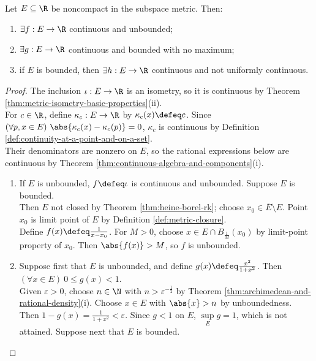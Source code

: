 \begin{theorem} \label{thm:compactness-hypotheses-are-essential} \\
Let $E\subseteq\R$ be noncompact in the subspace metric. Then:
\begin{enumerate}[label=(\roman*)]
\setlength{\itemsep}{0pt}
\item $\exists f:E\to\R$ continuous and unbounded;
\item $\exists g:E\to\R$ continuous and bounded with no maximum;
\item if $E$ is bounded, then $\exists h:E\to\R$ continuous and not uniformly continuous.
\end{enumerate}
\begin{proof}
The inclusion $\iota:E\to\R$ is an isometry, so it is continuous by Theorem \ref{thm:metric-isometry-basic-properties}(ii).\\
For $c\in\R$, define $\kappa_c:E\to\R$ by $\kappa_c(x)\defeq c$. Since $(\forall p,x\in E)\ \abs{\kappa_c(x)-\kappa_c(p)}=0$, $\kappa_c$ is continuous by Definition \ref{def:continuity-at-a-point-and-on-a-set}.\\
Their denominators are nonzero on $E$, so the rational expressions below are continuous by Theorem \ref{thm:continuous-algebra-and-components}(i).
\begin{enumerate}[label=(\roman*)]
\setlength{\itemsep}{0pt}
\item If $E$ is unbounded, $f\defeq\iota$ is continuous and unbounded. Suppose $E$ is bounded.\\
Then $E$ not closed by Theorem \ref{thm:heine-borel-rk}; choose $x_0\in\overline{E}\setminus E$. Point $x_0$ is limit point of $E$ by Definition \ref{def:metric-closure}.\\
Define $f(x)\defeq\frac{1}{x-x_0}$. For $M>0$, choose $x\in E\cap B_{\frac{1}{M}}(x_0)$ by limit-point property of $x_0$. Then $\abs{f(x)}>M$, so $f$ is unbounded.
\item Suppose first that $E$ is unbounded, and define $g(x)\defeq\frac{x^2}{1+x^2}$. Then $(\forall x\in E)\ 0\leq g(x)<1$.\\
Given $\varepsilon>0$, choose $n\in\N$ with $n>\varepsilon^{-\frac{1}{2}}$ by Theorem \ref{thm:archimedean-and-rational-density}(i). Choose $x\in E$ with $\abs{x}>n$ by unboundedness.\\
Then $1-g(x)=\frac{1}{1+x^2}<\varepsilon$. Since $g<1$ on $E$, $\sup\limits_E g=1$, which is not attained. Suppose next that $E$ is bounded.\\

\end{enumerate}
\end{proof}
\end{theorem}
